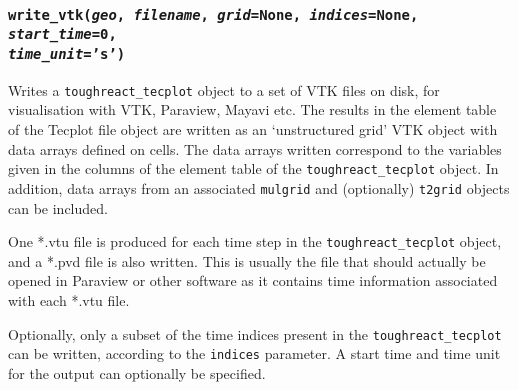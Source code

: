 \begin{snugshade}
\subsubsection{\texttt{write\_vtk(\emph{geo}, \emph{filename}, \emph{grid}=None, \emph{indices}=None, \emph{start\_time}=0,\\
    \emph{time\_unit}='s')}}
\end{snugshade}
\label{sec:toughreact_tecplot:write_vtk}

Writes a \texttt{toughreact\_tecplot} object to a set of VTK files on disk, for visualisation with VTK, Paraview, Mayavi etc.  The results in the element table of the Tecplot file object are written as an `unstructured grid' VTK object with data arrays defined on cells.  The data arrays written correspond to the variables given in the columns of the element table of the \texttt{toughreact\_tecplot} object. In addition, data arrays from an associated \texttt{mulgrid} and (optionally) \texttt{t2grid} objects can be included.

One *.vtu file is produced for each time step in the \texttt{toughreact\_tecplot} object, and a *.pvd file is also written.  This is usually the file that should actually be opened in Paraview or other software as it contains time information associated with each *.vtu file.

Optionally, only a subset of the time indices present in the \texttt{toughreact\_tecplot} can be written, according to the \texttt{indices} parameter.  A start time and time unit for the output can optionally be specified.

